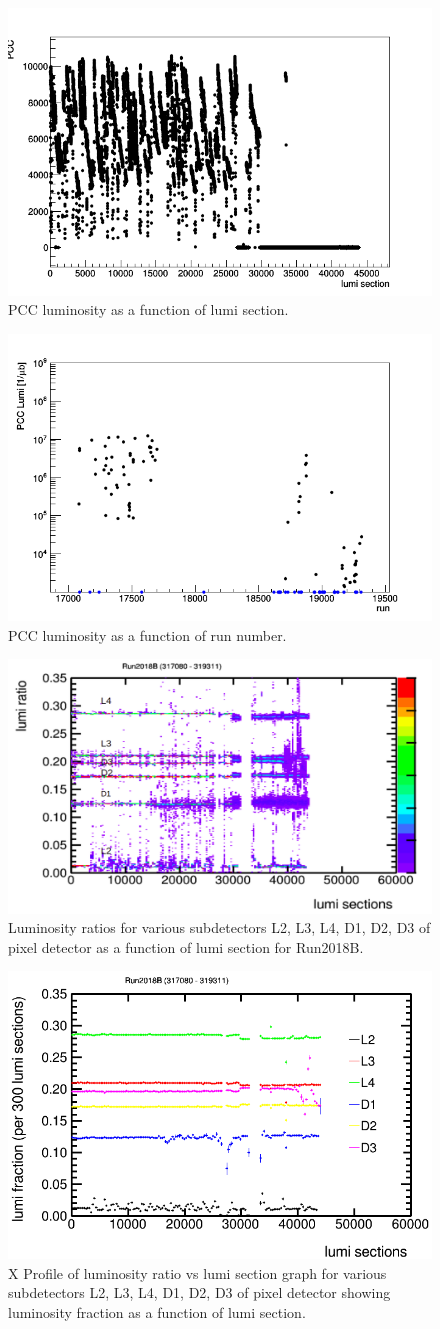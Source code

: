 \begin{figure}[H]
  \centering
  \includegraphics[width=0.52\columnwidth]{./ls_lumi_2018B.png}
  \caption{PCC luminosity as a function of lumi section.}
  \label{fig:CMS}
\end{figure}


\begin{figure}[H]
  \centering
  \includegraphics[width=0.52\columnwidth]{./runs_2018B.png}
  \caption{PCC luminosity as a function of run number.}
  \label{fig:CMS}
\end{figure}


\begin{figure}[H]
  \centering
  \includegraphics[width=0.52\columnwidth]{./2018B_lumiratio.png}
  \caption{Luminosity ratios for various subdetectors L2, L3, L4, D1, D2, D3 of pixel detector as a function of lumi section for Run2018B.}
  \label{fig:CMS}
\end{figure}



\begin{figure}[H]
  \centering
  \includegraphics[width=0.5\columnwidth]{./ProfileXcombinedB_new.png}
  \caption{X Profile of luminosity ratio vs lumi section graph for various subdetectors L2, L3, L4, D1, D2, D3 of pixel detector showing luminosity fraction as a function of lumi section.}
  \label{fig:CMS}
\end{figure}



